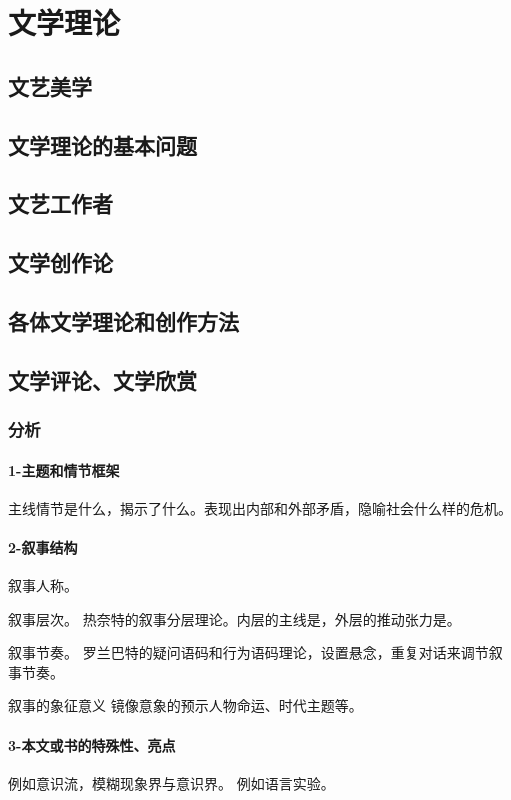 \documentclass[UTF8]{../../RepresentationUniverse}
\begin{document}
\chapter{文学理论}


\section{文艺美学}
\section{文学理论的基本问题}
\section{文艺工作者}
\section{文学创作论}
\section{各体文学理论和创作方法}


\section{文学评论、文学欣赏}


\subsection{分析}
\subsubsection{1-主题和情节框架}
主线情节是什么，揭示了什么。表现出内部和外部矛盾，隐喻社会什么样的危机。


\subsubsection{2-叙事结构}

叙事人称。

叙事层次。
热奈特的叙事分层理论。内层的主线是，外层的推动张力是。

叙事节奏。
罗兰巴特的疑问语码和行为语码理论，设置悬念，重复对话来调节叙事节奏。

叙事的象征意义
镜像意象的预示人物命运、时代主题等。

\subsubsection{3-本文或书的特殊性、亮点}
例如意识流，模糊现象界与意识界。
例如语言实验。
\end{document}
